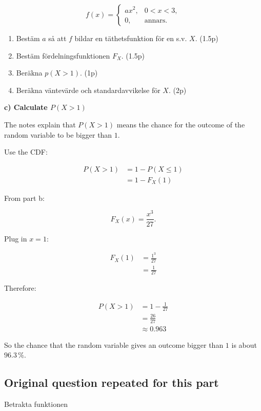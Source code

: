 \documentclass[10pt]{article}
\begin{document}
\[
f(x)=
\begin{cases}
ax^2,
& 0<x<3,\\
0,
& \text{annars.}
\end{cases}
\]

\begin{enumerate}[label=\alph*)]
\item
Bestäm $a$ så att $f$ bildar en täthetsfunktion för en s.v. $X$.
\hfill (1.5p)

\item
Bestäm fördelningsfunktionen $F_X$.
\hfill (1.5p)

\item
Beräkna $p(X>1)$.
\hfill (1p)

\item
Beräkna väntevärde och standardavvikelse för $X$.
\hfill (2p)
\end{enumerate}

\textbf{c) Calculate $P(X>1)$}

The notes explain that $P(X>1)$ means the chance for the outcome
of the random variable to be bigger than $1$.

Use the CDF:

\begin{align*}
P(X>1)
&=
1-P(X\leq 1) \\[2mm]
&=
1-F_X(1)
\end{align*}

From part b:

\[
F_X(x)=\frac{x^3}{27}.
\]

Plug in $x=1$:

\begin{align*}
F_X(1)
&=
\frac{1^3}{27} \\[2mm]
&=
\frac{1}{27}
\end{align*}

Therefore:

\begin{align*}
P(X>1)
&=
1-\frac{1}{27} \\[2mm]
&=
\frac{26}{27} \\[2mm]
&\approx 0.963
\end{align*}

So the chance that the random variable gives an outcome bigger
than $1$ is about $96.3\,\%$.

\subsection*{Original question repeated for this part}
Betrakta funktionen
\end{document}
